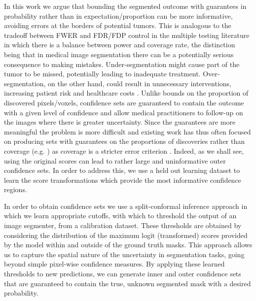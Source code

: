 In this work we argue that bounding the segmented outcome with guarantees in probability rather than in expectation/proportion can be more informative, avoiding errors at the borders of potential tumors. This is analogous to the tradeoff between FWER and FDR/FDP control in the multiple testing literature in which there is a balance between power and coverage rate, the distinction being that in medical image segmentation there can be a potentially serious consequence to making mistakes. Under-segmentation might cause part of the tumor to be missed, potentially leading to inadequate treatment. Over-segmentation, on the other hand, could result in unnecessary interventions, increasing patient risk and healthcare costs \citep{Gupta2020, Patz2014}. Unlike bounds on the proportion of discovered pixels/voxels, confidence sets are guaranteed to contain the outcome with a given level of confidence and allow medical practitioners to follow-up on the images where there is greater uncertainty. Since the guarantees are more meaningful the problem is more difficult and existing work has thus often focused on producing sets with guarantees on the proportions of discoveries rather than coverage (e.g. \cite{Bates2021}) as coverage is a stricter error criterion \citep{Mossina2024}. Indeed, as we shall see, using the original scores can lead to rather large and uninformative outer confidence sets. In order to address this, we use a held out learning dataset to learn the score transformations which provide the most informative confidence regions.

In order to obtain confidence sets we use a split-conformal inference approach in which we learn appropriate cutoffs, with which to threshold the output of an image segmenter, from a calibration dataset. These thresholds are obtained by considering the distribution of the maximum logit (transformed) scores provided by the model within and outside of the ground truth masks. This approach allows us to capture the spatial nature of the uncertainty in segmentation tasks, going beyond simple pixel-wise confidence measures. By applying these learned thresholds to new predictions, we can generate inner and outer confidence sets that are guaranteed to contain the true, unknown segmented mask with a desired probability. 
 